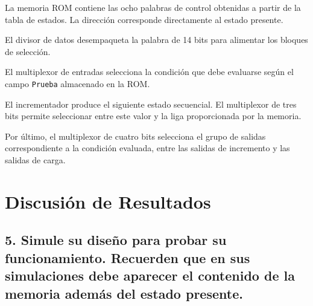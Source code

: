 \documentclass[12pt, letterpaper]{article}
\begin{document}


La memoria ROM contiene las ocho palabras de control obtenidas a partir de la
tabla de estados. La dirección corresponde directamente al estado presente.



El divisor de datos desempaqueta la palabra de 14 bits para alimentar los
bloques de selección.



El multiplexor de entradas selecciona la condición que debe evaluarse según
el campo \texttt{Prueba} almacenado en la ROM.



El incrementador produce el siguiente estado secuencial. El multiplexor de
tres bits permite seleccionar entre este valor y la liga proporcionada por
la memoria.





Por último, el multiplexor de cuatro bits selecciona el grupo de salidas
correspondiente a la condición evaluada, entre las salidas de incremento y
las salidas de carga.



\section*{Discusión de Resultados}

\subsection*{5. Simule su diseño para probar su funcionamiento. Recuerden que en sus simulaciones debe aparecer el contenido de la memoria además del estado presente.}
\end{document}
